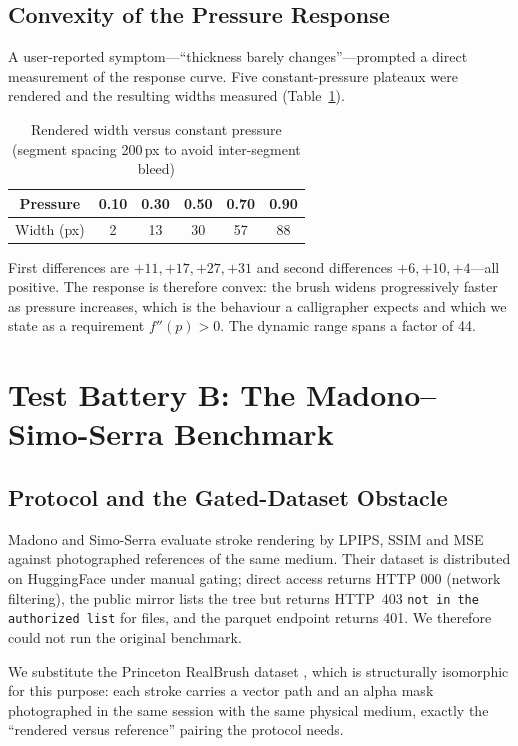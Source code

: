 \documentclass[conference]{IEEEtran}
\begin{document}
\subsection{Convexity of the Pressure Response}
\label{sec:convexity}

A user-reported symptom---``thickness barely changes''---prompted a direct
measurement of the response curve. Five constant-pressure plateaux were
rendered and the resulting widths measured
(Table~\ref{tab:convexity}).

\begin{table}[t]
\caption{Rendered width versus constant pressure (segment spacing 200\,px to
avoid inter-segment bleed)}
\label{tab:convexity}
\centering
\small
\begin{tabular}{cccccc}
\toprule
Pressure & 0.10 & 0.30 & 0.50 & 0.70 & 0.90 \\
\midrule
Width (px) & 2 & 13 & 30 & 57 & 88 \\
\bottomrule
\end{tabular}
\end{table}

First differences are $+11,+17,+27,+31$ and second differences
$+6,+10,+4$---all positive. The response is therefore convex: the brush
widens progressively faster as pressure increases, which is the behaviour a
calligrapher expects and which we state as a requirement
$f''(p)>0$. The dynamic range spans a factor of 44.

\section{Test Battery B: The Madono--Simo-Serra Benchmark}
\label{sec:batteryB}

\subsection{Protocol and the Gated-Dataset Obstacle}

Madono and Simo-Serra \cite{madono2023} evaluate stroke rendering by LPIPS,
SSIM and MSE against photographed references of the same medium. Their dataset
is distributed on HuggingFace under manual gating; direct access returns HTTP
000 (network filtering), the public mirror lists the tree but returns
HTTP~403 \texttt{not in the authorized list} for files, and the parquet
endpoint returns 401. We therefore could not run the original benchmark.

We substitute the Princeton RealBrush dataset \cite{lu2013}, which is
structurally isomorphic for this purpose: each stroke carries a vector path
and an alpha mask photographed in the same session with the same physical
medium, exactly the ``rendered versus reference'' pairing the protocol needs.
\end{document}
